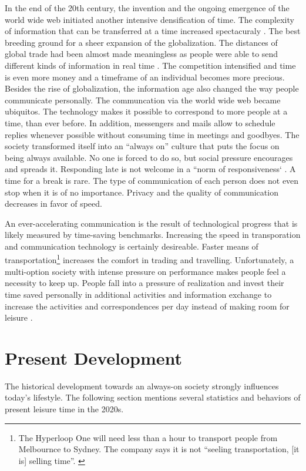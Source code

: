 \documentclass[12pt,numbers=noenddot,parskip,bibliography=totocnumbered,listof=totocnumbered,draft]{scrreprt}
\begin{document}
In the end of the 20th century, the invention and the ongoing emergence of the world wide web initiated another intensive densification of time. The complexity of information that can be transferred at a time increased spectacuraly \citep[p.45]{wajcman2014}. The best breeding ground for a sheer expansion of the globalization. The distances of global trade had been almost made meaningless as people were able to send different kinds of information in real time \citep[p.17]{wajcman2014}. The competition intensified and time is even more money and a timeframe of an individual becomes more precious. Besides the rise of globalization, the information age also changed the way people communicate personally. The communcation via the world wide web became ubiquitos. The technology makes it possible to correspond to more people at a time, than ever before. In addition, messengers and mails allow to schedule replies whenever possible without consuming time in meetings and goodbyes. The society transformed itself into an ``always on'' culture that puts the focus on being always available. No one is forced to do so, but social pressure encourages and spreads it. Responding late is not welcome in a ``norm of responsiveness` \citep[p.96]{wajcman2014}. A time for a break is rare. The type of communication of each person does not even stop when it is of no importance. Privacy and the quality of communication decreases in favor of speed.

An ever-accelerating communication is the result of technological progress that is likely measured by time-saving benchmarks. Increasing the speed in transporation and communication technology is certainly desireable. Faster means of transportation\footnote{The Hyperloop One will need less than a hour to transport people from Melbournce to Sydney. The company says it is not ``seeling transportation, [it is] selling time''. \cite{hyperloop2017}} increases the comfort in trading and travelling. Unfortunately, a multi-option society with intense pressure on performance makes people feel a necessity to keep up. People fall into a pressure of realization and invest their time saved personally in additional activities and information exchange to increase the activities and correspondences per day instead of making room for leisure \citep[p.27-30]{gross1994}.

\section{Present Development}
The historical development towards an always-on society strongly influences today's lifestyle. The following section mentions several statistics and behaviors of present leisure time in the 2020s.
\end{document}
